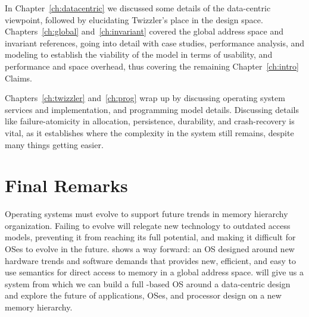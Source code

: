 In Chapter~\ref{ch:datacentric} we discussed some details of the data-centric viewpoint, followed by elucidating
Twizzler's place in the design space. Chapters~\ref{ch:global} and~\ref{ch:invariant} covered the global address
space and invariant references, going into detail with case studies, performance analysis, and modeling to
establish the viability of the model in terms of usability, and performance and space overhead, thus covering the
remaining Chapter~\ref{ch:intro} Claims.

Chapters~\ref{ch:twizzler} and~\ref{ch:prog} wrap up by discussing operating system services and implementation, and
programming model details. Discussing details like failure-atomicity in allocation, persistence, durability, and
crash-recovery is vital, as it establishes where the complexity in the system still remains, despite many things getting
easier.


\section{Final Remarks}



Operating systems must evolve to support future trends in memory hierarchy
organization. Failing to evolve will relegate new technology to
outdated access models, preventing it from reaching its full potential,
and making it difficult for OSes to evolve in the
future. \Twizzler shows a way forward: an
OS designed around new hardware trends and software demands that provides
new, efficient, and easy to use semantics for direct access to memory in a global address space.
\Twizzler will give us a system from which
we can build a full \NVM-based OS around a data-centric design and explore the future of applications, OSes, and
processor design on a new memory hierarchy.

